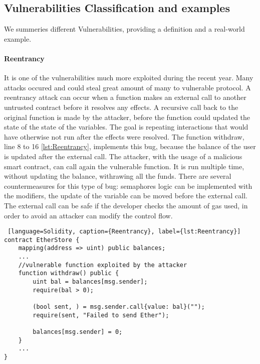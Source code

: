 \documentclass[a4paper,sigconf, language=french,
language=german, language=spanish, language=english]{acmart}
\begin{document}
\subsection{Vulnerabilities Classification and examples}
\label{sec:Vulnerabilities:Classification}
We summeries different Vulnerabilities, providing a definition and a real-world example.

\paragraph{Reentrancy} It is one of the vulnerabilities much more exploited during the recent year. 
Many attacks occured and could steal great amount of many to vulnerable protocol. 
A reentrancy attack can occur when a function makes an external call to another untrusted contract 
before it resolves any effects. 
A recursive call back to the original function is made by the attacker, before 
the function could updated the state of the state of the variables. 
The goal is repeating interactions that would have otherwise not run after the effects were resolved. 
The function withdraw, line 8 to 16 \autoref{lst:Reentrancy}, implements this bug, because the balance of the user is updated after the external call. 
The attacker, with the usage of a malicious smart contract, can call again the vulnerable function. 
It is run multiple time, without updating the balance, withrawing all the funds. There are several countermeasures for this type of bug: 
semaphores logic can be implemented with the modifiers, the update of the variable can be moved before the external call. 
The external call can be safe if the developer checks the amount of gas used, in order to avoid an attacker can modify the control flow. 
\begin{lstlisting} [language=Solidity, caption={Reentrancy}, label={lst:Reentrancy}]
contract EtherStore {
    mapping(address => uint) public balances;
    ...
    //vulnerable function exploited by the attacker
    function withdraw() public {
        uint bal = balances[msg.sender];
        require(bal > 0);

        (bool sent, ) = msg.sender.call{value: bal}("");
        require(sent, "Failed to send Ether");

        balances[msg.sender] = 0;
    }
    ...
}
  
\end{lstlisting}
\end{document}
